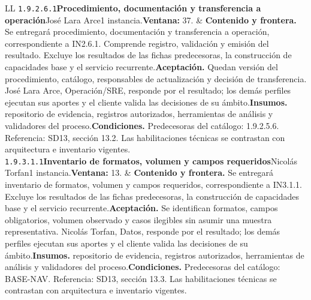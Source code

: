 \begin{longtable}{L{\tabcolsep\relax}L{\tabcolsep\relax}}
\texttt{1.\allowbreak{}9.\allowbreak{}2.\allowbreak{}6.\allowbreak{}1}\newline{}\textbf{Procedimiento, documentación y transferencia a operación}\newline{}José Lara Arce\newline{}1 instancia.\newline{}\textbf{Ventana:} 37. & \textbf{Contenido y frontera.} Se entregará procedimiento, documentación y transferencia a operación, correspondiente a IN2.6.1. Comprende registro, validación y emisión del resultado. Excluye los resultados de las fichas predecesoras, la construcción de capacidades base y el servicio recurrente.\newline{}\textbf{Aceptación.} Quedan versión del procedimiento, catálogo, responsables de actualización y decisión de transferencia. José Lara Arce, Operación/SRE, responde por el resultado; los demás perfiles ejecutan sus aportes y el cliente valida las decisiones de su ámbito.\newline{}\textbf{Insumos.} repositorio de evidencia, registros autorizados, herramientas de análisis y validadores del proceso.\newline{}\textbf{Condiciones.} Predecesoras del catálogo: 1.9.2.5.6. Referencia: SD13, sección 13.2. Las habilitaciones técnicas se contrastan con arquitectura e inventario vigentes.\\\hline
\texttt{1.\allowbreak{}9.\allowbreak{}3.\allowbreak{}1.\allowbreak{}1}\newline{}\textbf{Inventario de formatos, volumen y campos requeridos}\newline{}Nicolás Torfan\newline{}1 instancia.\newline{}\textbf{Ventana:} 13. & \textbf{Contenido y frontera.} Se entregará inventario de formatos, volumen y campos requeridos, correspondiente a IN3.1.1. Excluye los resultados de las fichas predecesoras, la construcción de capacidades base y el servicio recurrente.\newline{}\textbf{Aceptación.} Se identifican formatos, campos obligatorios, volumen observado y casos ilegibles sin asumir una muestra representativa. Nicolás Torfan, Datos, responde por el resultado; los demás perfiles ejecutan sus aportes y el cliente valida las decisiones de su ámbito.\newline{}\textbf{Insumos.} repositorio de evidencia, registros autorizados, herramientas de análisis y validadores del proceso.\newline{}\textbf{Condiciones.} Predecesoras del catálogo: BASE-NAV. Referencia: SD13, sección 13.3. Las habilitaciones técnicas se contrastan con arquitectura e inventario vigentes.\\\hline

\end{longtable}
